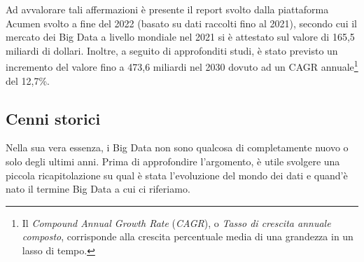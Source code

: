 Ad avvalorare tali affermazioni è presente il report svolto dalla piattaforma Acumen svolto a fine del 2022 (basato su dati raccolti fino al 2021), secondo cui il mercato dei Big Data a livello mondiale nel 2021 si è attestato sul valore di 165,5 miliardi di dollari. Inoltre, a seguito di approfonditi studi, è stato previsto un incremento del valore fino a 473,6 miliardi nel 2030 dovuto ad un CAGR annuale\footnote{Il \textit{Compound Annual Growth Rate} (\textit{CAGR}), o \textit{Tasso di crescita annuale composto}, corrisponde alla crescita percentuale media di una grandezza in un lasso di tempo.\cite{borsa_italiana_cagr}} del 12,7\%.\cite{acumen_big_data_market}

\subsection{Cenni storici}

Nella sua vera essenza, i Big Data non sono qualcosa di completamente nuovo o solo degli ultimi anni. Prima di approfondire l’argomento, è utile svolgere una piccola ricapitolazione su qual è stata l’evoluzione del mondo dei dati e quand’è nato il termine Big Data a cui ci riferiamo.

